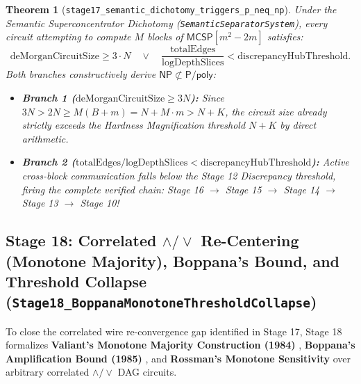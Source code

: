 \documentclass[11pt,a4paper]{article}
\theoremstyle{plain}
\newtheorem{theorem}{Theorem}[section]
\theoremstyle{definition}
\theoremstyle{remark}
\newcommand{\lean}[1]{\texttt{\textcolor{slate}{#1}}}
\newcommand{\MCSP}{\mathsf{MCSP}}
\newcommand{\NP}{\mathsf{NP}}
\newcommand{\Ppoly}{\mathsf{P/poly}}
\begin{document}
\begin{theorem}[\lean{stage17_semantic_dichotomy_triggers_p_neq_np}]\label{thm:stage17_capstone}
Under the Semantic Superconcentrator Dichotomy (\lean{SemanticSeparatorSystem}), every circuit attempting to compute $M$ blocks of $\MCSP[m^2 - 2m]$ satisfies:
\begin{equation}
    \mathrm{deMorganCircuitSize} \ge 3 \cdot N \quad \lor \quad \frac{\mathrm{totalEdges}}{\mathrm{logDepthSlices}} < \mathrm{discrepancyHubThreshold}.
\end{equation}
Both branches constructively derive $\NP \not\subset \Ppoly$:
\begin{itemize}[noitemsep]
    \item \textbf{Branch 1 ($\mathrm{deMorganCircuitSize} \ge 3N$):} Since $3N > 2N \ge M(B+m) = N + M \cdot m > N + K$, the circuit size already strictly exceeds the Hardness Magnification threshold $N + K$ by direct arithmetic.
    \item \textbf{Branch 2 ($\mathrm{totalEdges}/\mathrm{logDepthSlices} < \mathrm{discrepancyHubThreshold}$):} Active cross-block communication falls below the Stage 12 Discrepancy threshold, firing the complete verified chain: Stage 16 $\to$ Stage 15 $\to$ Stage 14 $\to$ Stage 13 $\to$ Stage 10!
\end{itemize}
\end{theorem}

\subsection{Stage 18: Correlated $\land / \lor$ Re-Centering (Monotone Majority), Boppana's Bound, and Threshold Collapse (\lean{Stage18\_BoppanaMonotoneThresholdCollapse})}
To close the correlated wire re-convergence gap identified in Stage 17, Stage 18 formalizes \textbf{Valiant's Monotone Majority Construction (1984)} \cite{Valiant1984}, \textbf{Boppana's Amplification Bound (1985)} \cite{Boppana1985}, and \textbf{Rossman's Monotone Sensitivity} \cite{Rossman2014} over arbitrary correlated $\land / \lor$ DAG circuits.
\end{document}
